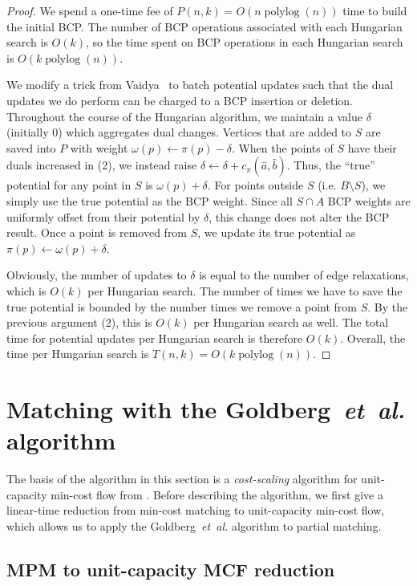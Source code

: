 \documentclass[11pt]{article}
\def\etal{\textsl{et~al.}}
\def\polylog{\mathop{\mathrm{polylog}}}
\theoremstyle{plain}
\begin{document}
\begin{proof}
	We spend a one-time fee of $P(n, k) = O(n \polylog(n))$ time to build 
	the initial BCP.
	The number of BCP operations associated with each Hungarian search is 
	$O(k)$, so the time spent on BCP operations in each Hungarian search
	is $O(k \polylog(n))$.
	
	We modify a trick from Vaidya~\cite{Vaidya89} to batch potential 
	updates such that the dual updates we do perform can be charged to a 
	BCP insertion or deletion.
	Throughout the course of the Hungarian algorithm, we maintain a value
	$\delta$ (initially 0) which aggregates dual changes.
	Vertices that are added to $S$ are saved into $P$ with weight 
	$\omega(p) \gets \pi(p) - \delta$.
	When the points of $S$ have their duals increased in (2), we instead
	raise $\delta \gets \delta + c_\pi(\hat{a}, \hat{b})$.
	Thus, the ``true'' potential for any point in $S$ is 
	$\omega(p) + \delta$.
	For points outside $S$ (i.e. $B \setminus S$), we simply use the true 
	potential as the BCP weight.
	Since all $S \cap A$ BCP weights are uniformly offset from their 
	potential by $\delta$, this change does not alter the BCP result.
	Once a point is removed from $S$, we update its true potential
	as $\pi(p) \gets \omega(p) + \delta$.

	Obviously, the number of updates to $\delta$ is equal to the number of 
	edge relaxations, which is $O(k)$ per Hungarian search.
	The number of times we have to save the true potential is bounded by
	the number times we remove a point from $S$.
	By the previous argument (2), this is $O(k)$ per Hungarian search as 
	well.
	The total time for potential updates per Hungarian search is therefore 
	$O(k)$.
	Overall, the time per Hungarian search is $T(n, k) = O(k\polylog(n))$.
\end{proof}


\section{Matching with the Goldberg~{\etal} algorithm}
\label{section:goldberg}

The basis of the algorithm in this section is a \emph{cost-scaling} algorithm 
for unit-capacity min-cost flow from \cite{GHKT17}.
Before describing the algorithm, we first give a linear-time reduction from 
min-cost matching to unit-capacity min-cost flow, which allows us to apply the 
Goldberg~{\etal} algorithm to partial matching.

\subsection{MPM to unit-capacity MCF reduction}
\label{subsection:mcm_mcf_reduction}
\end{document}
